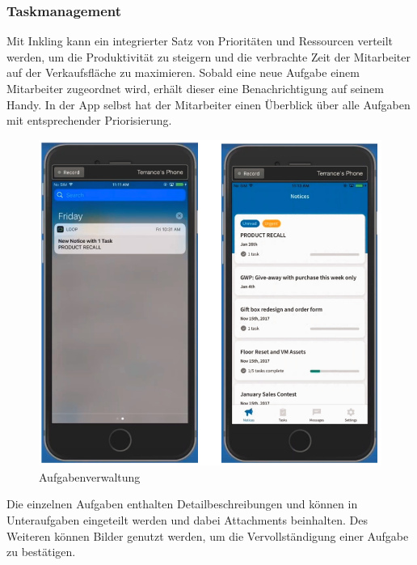 \subsubsection{Taskmanagement}

Mit Inkling kann ein integrierter Satz von Prioritäten und Ressourcen verteilt werden, um die Produktivität zu steigern und die verbrachte Zeit der Mitarbeiter auf der Verkaufsfläche zu maximieren. Sobald eine neue Aufgabe einem Mitarbeiter zugeordnet wird, erhält dieser eine Benachrichtigung auf seinem Handy. In der App selbst hat der Mitarbeiter einen Überblick über alle Aufgaben mit entsprechender Priorisierung.

\begin{figure}[H] 
\centering 
\includegraphics[scale=0.72]{images/inktasks} 
\caption[Aufgabenverwaltung]{Aufgabenverwaltung\protect} 
\label{ws} 
\end{figure}

Die einzelnen Aufgaben enthalten Detailbeschreibungen und können in Unteraufgaben eingeteilt werden und dabei Attachments beinhalten. Des Weiteren können Bilder genutzt werden, um die Vervollständigung einer Aufgabe zu bestätigen.

